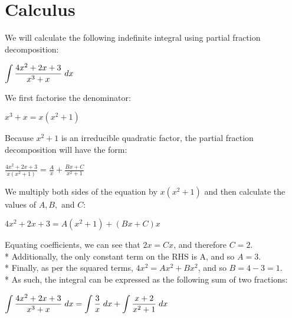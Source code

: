\message{ !name(written11.tex)}\documentclass{article}
\begin{document}
\section*{\fontsize{12}{15}\selectfont Calculus}
We will calculate the following indefinite integral using partial fraction decomposition:
\begin{center}
 \( \displaystyle\int \frac{4x^2 + 2x + 3}{x^3 + x} \hspace{0.1cm} dx\)
\end{center}
We first factorise the denominator:
\begin{center}
\( \displaystyle x^3 + x = x(x^2 + 1)\)
\end{center}
Because $x^2 + 1$ is an irreducible quadratic factor, the partial fraction decomposition will have the form:
\begin{center}
  \( \displaystyle \frac{4x^2 + 2x + 3}{x(x^2 + 1)} = \frac{A}{x} + \frac{Bx + C}{x^2 + 1}\) 
\end{center}
\vspace{0.3cm}
We multiply both sides of the equation by \(x(x^2+1)\) and then calculate the values of $A, B,$ and $C:$
\begin{center}

\( \displaystyle 4x^2 + 2x + 3 = A(x^2+1) + (Bx + C)x \)
\end{center}
\vspace{0.1cm}
Equating coefficients, we can see that $2x = Cx$, and therefore $C = 2$. \hspace{0.01cm}
\vspace{0.2cm} \\*
\hspace{0.01cm}
\vspace{0.2cm}
Additionally, the only constant term on the RHS is A, and so $A = 3$.\\*
\hspace{0.01cm} \vspace{0.03cm}
Finally, as per the squared terms, $4x^2 = Ax^2 +  Bx^2$, and so $B = 4 - 3 = 1$. \vspace{0.5cm} \\*
\hspace{0.01cm} \vspace{0.2cm}
As such, the integral can be expressed as the following sum of two fractions:
\begin{center}
  \( \displaystyle\int \frac{4x^2 + 2x + 3}{x^3 + x} \hspace{0.1cm} dx = \int \frac{3}{x} \hspace{0.1cm} dx + \int \frac{x + 2}{x^2+1} \hspace{0.1cm} dx\)
 \end{center}
 
\end{document}
